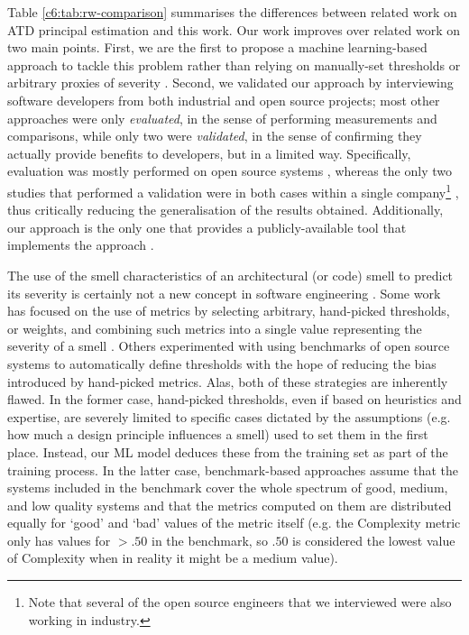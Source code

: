 Table \ref{c6:tab:rw-comparison} summarises the differences between related work on ATD principal estimation and this work. 
Our work improves over related work on two main points.
First, we are the first to propose a machine learning-based approach to tackle this problem rather than relying on manually-set thresholds \cite{Wu2018,Martini2018b} or arbitrary proxies of severity \cite{Roveda2018}.
Second, we validated our approach by interviewing software developers from both industrial and open source projects; most other approaches were only \emph{evaluated}, in the sense of performing measurements and comparisons, while only two were \emph{validated}, in the sense of confirming they actually provide benefits to developers, but in a limited way.
Specifically, evaluation was mostly performed on open source systems \cite{Xiao2016,Roveda2018,Verdecchia2020}, whereas the only two studies that performed a validation were in both cases within a single company\footnote{Note that several of the open source engineers that we interviewed were also working in industry.} \cite{Martini2018b,Wu2018}, thus critically reducing the generalisation of the results obtained. 
Additionally, our approach is the only one that provides a publicly-available tool that implements the approach \cite{ReplicationPackageC6}.

The use of the smell characteristics of an architectural (or code) smell to predict its severity is certainly not a new concept in software engineering \cite{Laval2012,Tsantalis2011,Arcelli2015b,Vidal2016,Roveda2018}.
Some work has focused on the use of metrics by selecting arbitrary, hand-picked thresholds, or weights, and combining such metrics into a single value representing the severity of a smell \cite{Laval2012,Vidal2016}.
Others experimented with using benchmarks of open source systems to automatically define thresholds \cite{Arcelli2015b} with the hope of reducing the bias introduced by hand-picked metrics. 
Alas, both of these strategies are inherently flawed. In the former case, hand-picked thresholds, even if based on heuristics and expertise, are severely limited to specific cases dictated by the assumptions (e.g. how much a design principle influences a smell) used to set them in the first place.
Instead, our ML model deduces these from the training set as part of the training process.
In the latter case, benchmark-based approaches assume that the systems included in the benchmark cover the whole spectrum of good, medium, and low quality systems and that the metrics computed on them are distributed equally for `good' and `bad' values of the metric itself (e.g. the Complexity metric only has values for $>.50$ in the benchmark, so $.50$ is considered the lowest value of Complexity when in reality it might be a medium value).

